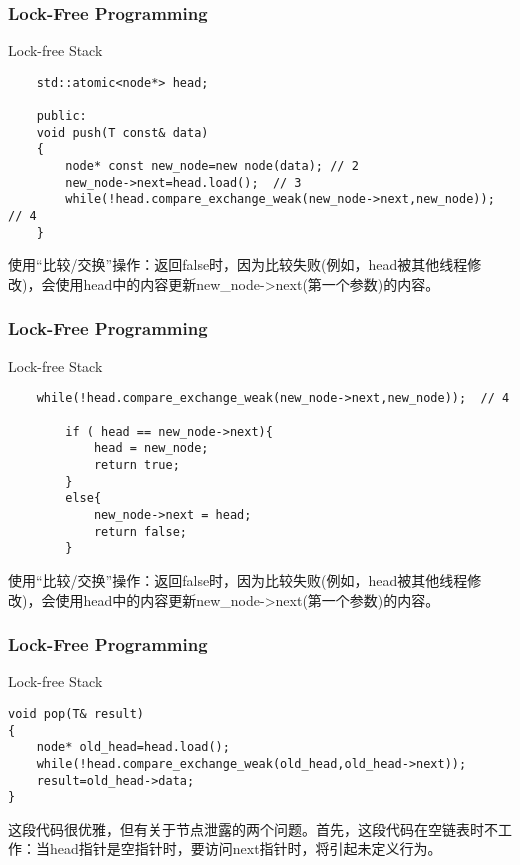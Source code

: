 \begin{frame}[fragile]
    \frametitle{Lock-Free Programming}
    \LARGE
    Lock-free Stack
    \normalsize    
    \begin{block}{}
        \begin{verbatim}
    std::atomic<node*> head;
    
    public:
    void push(T const& data)
    {
        node* const new_node=new node(data); // 2
        new_node->next=head.load();  // 3
        while(!head.compare_exchange_weak(new_node->next,new_node));  // 4
    }
        \end{verbatim}
    \end{block}
    使用“比较/交换”操作：返回false时，因为比较失败(例如，head被其他线程修改)，会使用head中的内容更新new\_node->next(第一个参数)的内容。
\end{frame}

\begin{frame}[fragile]
    \frametitle{Lock-Free Programming}
    \LARGE
    Lock-free Stack
    \normalsize    
    \begin{block}{}
        \begin{verbatim}
    while(!head.compare_exchange_weak(new_node->next,new_node));  // 4
        
        if ( head == new_node->next){
            head = new_node;
            return true;
        }
        else{
            new_node->next = head;
            return false;
        }
        \end{verbatim}
    \end{block}
    使用“比较/交换”操作：返回false时，因为比较失败(例如，head被其他线程修改)，会使用head中的内容更新new\_node->next(第一个参数)的内容。
\end{frame}


\begin{frame}[fragile]
    \frametitle{Lock-Free Programming}
    \LARGE
    Lock-free Stack
    \normalsize    
    \begin{block}{}
        \begin{verbatim}
void pop(T& result)
{
    node* old_head=head.load();
    while(!head.compare_exchange_weak(old_head,old_head->next));
    result=old_head->data;
}
        \end{verbatim}
    \end{block}
这段代码很优雅，但有关于节点泄露的两个问题。首先，这段代码在空链表时不工作：当head指针是空指针时，要访问next指针时，将引起未定义行为。

\end{frame}

